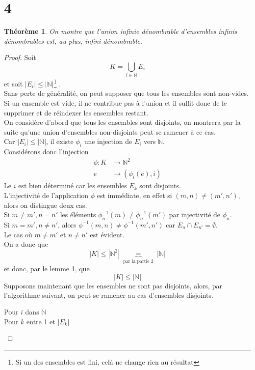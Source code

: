 \documentclass[11pt, a4paper]{article}
\newtheorem{theorem}{Théorème}
\begin{document}
\section*{4}
\begin{theorem}
	On montre que l'union infinie dénombrable d'ensembles infinis dénombrables est, au plus, infini dénombrable.
\end{theorem}
\begin{proof}
Soit
\[ 
K = \bigcup_{i \in \mathbb{N}} E_i
\]
et soit $|E_i| \leq |\mathbb{N}|$\footnote{Si un des ensembles est fini, celà ne change rien au résultat} .\\
Sans perte de généralité, on peut supposer que tous les ensembles sont non-vides. Si un ensemble est vide, il ne contribue pas à l'union et il suffit donc de le supprimer et de réindexer les ensembles restant.\\
On considère d'abord que tous les ensembles sont disjoints, on montrera par la suite qu'une union d'ensembles non-disjoints peut se ramener à ce cas.\\
Car $|E_i| \leq |\mathbb{N}|$, il existe $\phi_i$ une injection de $E_i$ vers $\mathbb{N}$.\\
Considérons donc l'injection
\begin{align*}
	\phi : K &\to \mathbb{N}^{2}\\
	e &\to (\phi_i(e),i) 
\end{align*}
Le $i$ est bien déterminé car les ensembles $E_k$ sont disjoints.\\
L'injectivité de l'application $\phi$ est immédiate, en effet si $( m,n )\neq (m',n')$, alors on distingue deux cas.\\
Si $m\neq m', n = n'$ les éléments $\phi^{-1}_n(m) \neq \phi^{-1}_n(m')$ par injectivité de $\phi_n$.\\
Si $m=m', n\neq n'$, alors $\phi^{-1}(m,n) \neq \phi^{-1}(m',n')$ car $E_n \cap E_{n'} = \emptyset.$\\
Le cas où $m\neq m'$ et $n\neq n'$ est évident.\\
On a donc que
\[ 
|K| \leq |\mathbb{N}^{2}| \underbrace{=}_{ \text{ par la partie 2 } } |\mathbb{N}|
\]
et donc, par le lemme 1, que
 \[ 
|K| \leq |\mathbb{N}|
\]
Supposons maintenant que les ensembles ne sont pas disjoints, alors, par l'algorithme suivant, on peut se ramener au cas d'ensembles disjoints.
\begin{flushleft}
Pour $i$ dans $\mathbb{N}$ \\
\quad Pour $k$ entre 1 et $|E_k|$ \\

\end{flushleft}
\end{proof}
\end{document}
